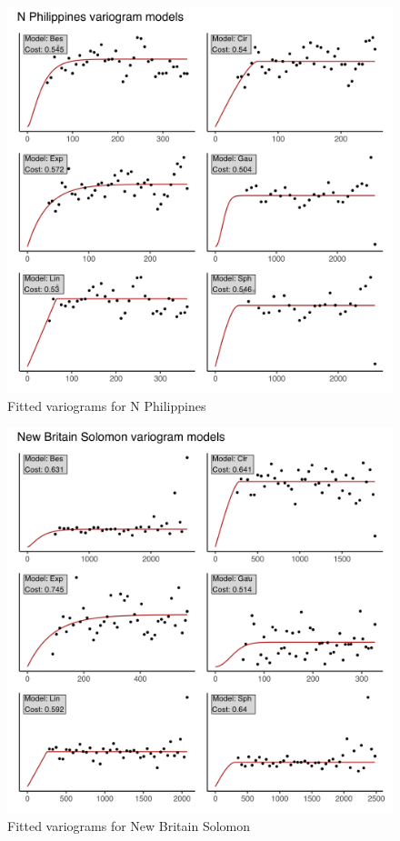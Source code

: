 \begin{figure}
\centering
\includegraphics{assets/figs/chpt3/NPhilippinesVgrms.png}
\caption[Fitted variograms for N Philippines]{Fitted variograms for N Philippines}
\end{figure}

\begin{figure}
\centering
\includegraphics{assets/figs/chpt3/NewBritainSolomonVgrms.png}
\caption[Fitted variograms for New Britain Solomon]{Fitted variograms for New Britain Solomon}
\end{figure}

